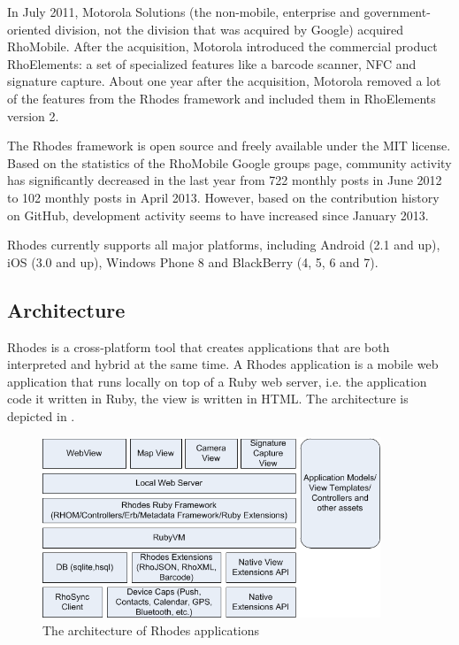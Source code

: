 In July 2011, Motorola Solutions (the non-mobile, enterprise and government-oriented division, not the division that was acquired by Google) acquired RhoMobile. After the acquisition, Motorola introduced the commercial product RhoElements: a set of specialized features like a barcode scanner, NFC and signature capture. About one year after the acquisition, Motorola removed a lot of the features from the Rhodes framework and included them in RhoElements version 2.

The Rhodes framework is open source and freely available under the MIT license. Based on the statistics of the RhoMobile Google groups page,  community activity has significantly decreased in the last year from 722 monthly posts in June 2012 to 102 monthly posts in April 2013. However, based on the contribution history on GitHub, development activity seems to have increased since January 2013.

Rhodes currently supports all major platforms, including Android (2.1 and up), iOS (3.0 and up), Windows Phone 8 and BlackBerry (4, 5, 6 and 7).

\subsection{Architecture}

Rhodes is a cross-platform tool that creates applications that are both interpreted and hybrid at the same time. A Rhodes application is a mobile web application that runs locally on top of a Ruby web server, i.e. the application code it written in Ruby, the view is written in HTML. The architecture is depicted in .

\begin{figure}[h]
    \begin{center}
        \includegraphics[width=0.9\textwidth]{figs/rhodes-architecture.png}
        \caption{The architecture of Rhodes applications \cite{Rhodes:Overview}}
        \label{fig:rhodes-architecture}
    \end{center}
\end{figure}

